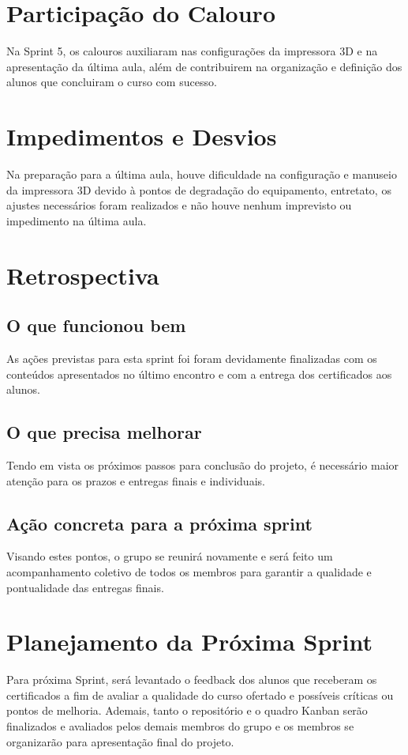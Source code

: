 \documentclass[12pt,a4paper]{article}
\begin{document}
\section{Participação do Calouro}
Na Sprint 5, os calouros auxiliaram nas configurações da impressora 3D e na apresentação da última aula, além de contribuirem na organização e definição dos alunos que concluiram o curso com sucesso.

\section{Impedimentos e Desvios}
Na preparação para a última aula, houve dificuldade na configuração e manuseio da impressora 3D devido à pontos de degradação do equipamento, entretato, os ajustes necessários foram realizados e não houve nenhum imprevisto ou impedimento na última aula.

\section{Retrospectiva}
\subsection*{O que funcionou bem}
As ações previstas para esta sprint foi foram devidamente finalizadas com os conteúdos apresentados no último encontro e com a entrega dos certificados aos alunos. 

\subsection*{O que precisa melhorar}
Tendo em vista os próximos passos para conclusão do projeto, é necessário maior atenção para os prazos e entregas finais e individuais. 

\subsection*{Ação concreta para a próxima sprint}
Visando estes pontos, o grupo se reunirá novamente e será feito um acompanhamento coletivo de todos os membros para garantir a qualidade e pontualidade das entregas finais. 

\section{Planejamento da Próxima Sprint}
Para próxima Sprint, será levantado o feedback dos alunos que receberam os certificados a fim de avaliar a qualidade do curso ofertado e possíveis críticas ou pontos de melhoria. Ademais, tanto o repositório e o quadro Kanban serão finalizados e avaliados pelos demais membros do grupo e os membros se organizarão para apresentação final do projeto.
\end{document}

